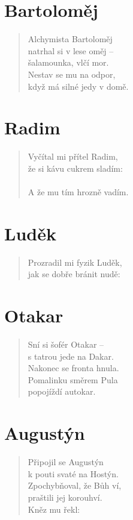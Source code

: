 \section*{Bartoloměj}
\begin{verse}
Alchymista Bartoloměj\\
natrhal si v lese oměj --\\
šalamounka, vlčí mor.\\
Nestav se mu na odpor,\\
když má silné jedy v domě.
\end{verse}

\section*{Radim}
\begin{verse}
Vyčítal mi přítel Radim,\\
že si kávu cukrem sladím:\\
\\
A že mu tím hrozně vadím.
\end{verse}

\section*{Luděk}
\begin{verse}
Prozradil mi fyzik Luděk,\\
jak se dobře bránit nudě:\\
\end{verse}

\section*{Otakar}
\begin{verse}
Sní si šofér Otakar --\\
s tatrou jede na Dakar.\\
Nakonec se fronta hnula.\\
Pomalinku směrem Pula\\
popojíždí autokar.
\end{verse}

\section*{Augustýn}
\begin{verse}
Připojil se Augustýn\\
k pouti svaté na Hostýn.\\
Zpochybňoval, že Bůh ví,\\
praštili jej korouhví.\\
Kněz mu řekl: 
\end{verse}

